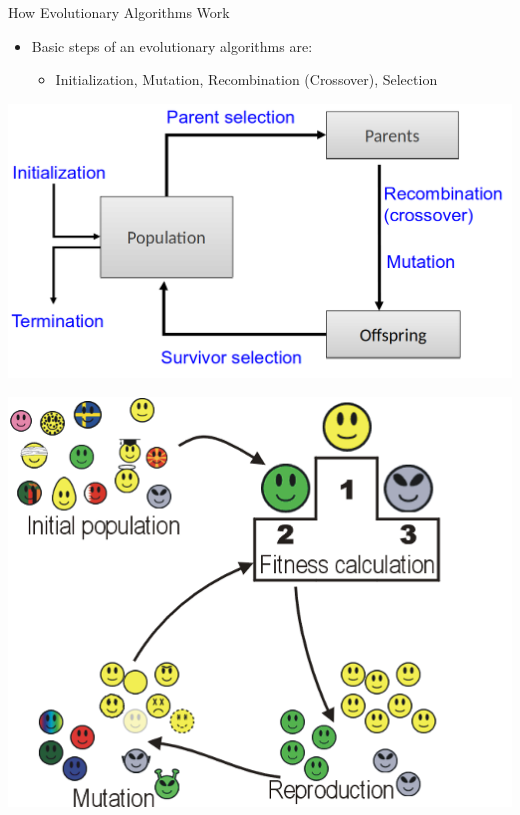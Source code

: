 \begin{frame}[c]{How Evolutionary Algorithms Work}
\begin{itemize}
    \item Basic steps of an evolutionary algorithms are: 
    \begin{itemize}
        \item Initialization, Mutation, Recombination (Crossover), Selection
    \end{itemize}
\end{itemize}
\pause
\begin{center}
\begin{minipage}[c]{0.49\textwidth}
\includegraphics[width=\textwidth]{new_images/EAs1.png}
\end{minipage}
\begin{minipage}[c]{0.49\textwidth}
\includegraphics[width=\textwidth]{new_images/EAs4.png} 
\end{minipage}
\end{center}
\end{frame}

